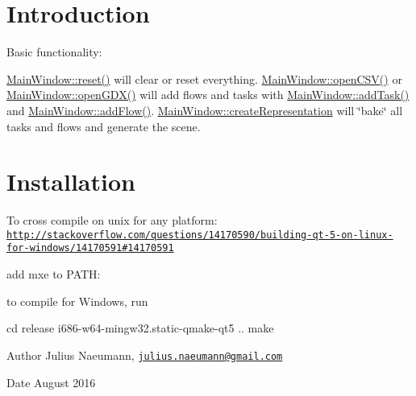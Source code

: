 \hypertarget{index_intro_sec}{}\section{Introduction}\label{index_intro_sec}
Basic functionality\+:

\hyperlink{class_main_window_a02076de46e6810174817ebfc6ddd2be5}{Main\+Window\+::reset()} will clear or reset everything. \hyperlink{class_main_window_a580a35d29abc0a0c82edf183e7f87b74}{Main\+Window\+::open\+C\+S\+V()} or \hyperlink{class_main_window_a23e9c749c8f0e5119317ea6484b9476f}{Main\+Window\+::open\+G\+D\+X()} will add flows and tasks with \hyperlink{class_main_window_a2920d5c6c64925cb5f87c7fdac3f54b0}{Main\+Window\+::add\+Task()} and \hyperlink{class_main_window_a645f1cd085c2636dc4eccb320455a6f4}{Main\+Window\+::add\+Flow()}. \hyperlink{class_main_window_a0b3d1510d0e0ed665daa74d6823e00d6}{Main\+Window\+::create\+Representation} will \char`\"{}bake\char`\"{} all tasks and flows and generate the scene.\hypertarget{index_install_sec}{}\section{Installation}\label{index_install_sec}
To cross compile on unix for any platform\+: \href{http://stackoverflow.com/questions/14170590/building-qt-5-on-linux-for-windows/14170591#14170591}{\tt http\+://stackoverflow.\+com/questions/14170590/building-\/qt-\/5-\/on-\/linux-\/for-\/windows/14170591\#14170591}


\begin{DoxyEnumerate}
\item add mxe to P\+A\+T\+H\+:

\item to compile for Windows, run 
\begin{DoxyCode}
cd release
i686-w64-mingw32.static-qmake-qt5 ..
make
\end{DoxyCode}

\end{DoxyEnumerate}

\begin{DoxyAuthor}{Author}
Julius Naeumann, \href{mailto:julius.naeumann@gmail.com}{\tt julius.\+naeumann@gmail.\+com} 
\end{DoxyAuthor}
\begin{DoxyDate}{Date}
August 2016 
\end{DoxyDate}
